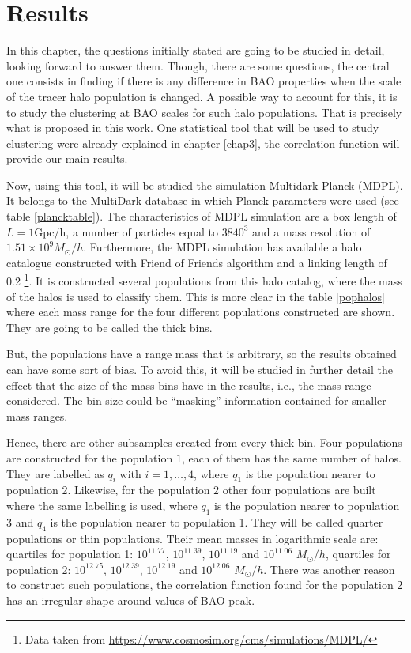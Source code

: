 \chapter{ Results }

In this chapter, the questions initially stated are going to be studied in detail, 
looking forward to answer them. Though, there are some questions, the central one
consists in finding if there is any difference in BAO properties when the scale of the tracer
halo population is changed. A possible way to account for this, it is to study the 
clustering at BAO scales for such halo populations. That is precisely what is proposed
in this work. 
One statistical tool that will be used to study clustering were already explained in chapter \ref{chap3},
the correlation function will provide our main results. 


Now, using this tool, it will be studied the simulation Multidark Planck (MDPL). 
It belongs to the MultiDark database in which Planck parameters were used
(see table \ref{plancktable}). The characteristics of MDPL
simulation are a box length of $L=1$Gpc/h, a number of particles equal to 
$3840^3$ and a mass resolution of $1.51\times 10^9 M_{\odot}/h$.
Furthermore, the MDPL simulation has available a halo catalogue constructed with Friend of 
Friends algorithm and a linking length of 0.2 \footnote{ Data taken from \url{https://www.cosmosim.org/cms/simulations/MDPL/}}. 
It is constructed several populations from this halo catalog, where the mass of the halos is used to
classify them. This is more clear in the table \ref{pophalos} where each mass range for 
the four different populations constructed are shown. They are going to be called the 
thick bins. 

But, the populations have a range mass that is arbitrary, so
the results obtained can have some sort of bias. To avoid this, 
it will be studied in further detail the effect that 
the size of the mass bins have in the results, i.e., the mass
range considered. The bin size could be ``masking'' information
contained for smaller mass ranges. 	

Hence, there are other subsamples created from every thick bin.
Four populations are constructed for the population $1$,  
each of them has the same number of halos. %
They are labelled as $q_i$ with $i=1,\dots,4$, where $q_1$ is the population
nearer to population 2.
Likewise, for the population $2$ other four populations are built where
the same labelling is used, where $q_1$ is the population nearer to population 3 
and $q_4$ is the population nearer to population 1. They will be called quarter populations or thin
populations. 
Their mean masses in logarithmic scale are: quartiles for population 1: 
$10^{11.77}$, $10^{11.39}$, $10^{11.19}$ and $10^{11.06}$ $M_{\odot}/h$, quartiles for population 2:
$10^{12.75}$, $10^{12.39}$, $10^{12.19}$ and $10^{12.06}$ $M_{\odot}/h$.
There was another reason to construct such populations, the correlation function
found for the population 2 has an irregular shape around values of BAO peak. 
	
